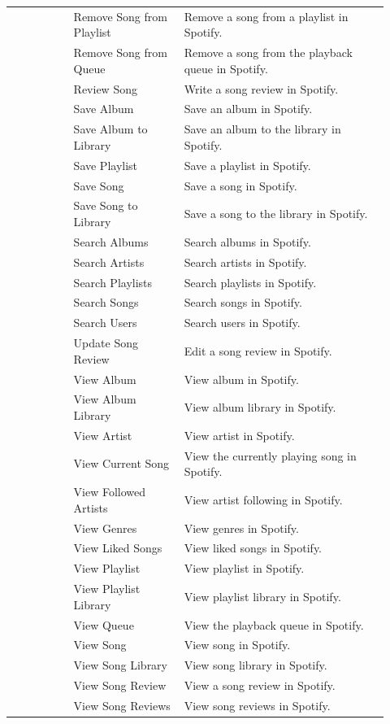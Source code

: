 \begin{longtable}{@{}p{0.15\linewidth}p{0.27\linewidth}p{0.50\linewidth}@{}}
 & Remove Song from Playlist & Remove a song from a playlist in Spotify. \\
 & Remove Song from Queue & Remove a song from the playback queue in Spotify. \\
 & Review Song & Write a song review in Spotify. \\
 & Save Album & Save an album in Spotify. \\
 & Save Album to Library & Save an album to the library in Spotify. \\
 & Save Playlist & Save a playlist in Spotify. \\
 & Save Song & Save a song in Spotify. \\
 & Save Song to Library & Save a song to the library in Spotify. \\
 & Search Albums & Search albums in Spotify. \\
 & Search Artists & Search artists in Spotify. \\
 & Search Playlists & Search playlists in Spotify. \\
 & Search Songs & Search songs in Spotify. \\
 & Search Users & Search users in Spotify. \\
 & Update Song Review & Edit a song review in Spotify. \\
 & View Album & View album in Spotify. \\
 & View Album Library & View album library in Spotify. \\
 & View Artist & View artist in Spotify. \\
 & View Current Song & View the currently playing song in Spotify. \\
 & View Followed Artists & View artist following in Spotify. \\
 & View Genres & View genres in Spotify. \\
 & View Liked Songs & View liked songs in Spotify. \\
 & View Playlist & View playlist in Spotify. \\
 & View Playlist Library & View playlist library in Spotify. \\
 & View Queue & View the playback queue in Spotify. \\
 & View Song & View song in Spotify. \\
 & View Song Library & View song library in Spotify. \\
 & View Song Review & View a song review in Spotify. \\
 & View Song Reviews & View song reviews in Spotify. \\

\end{longtable}
